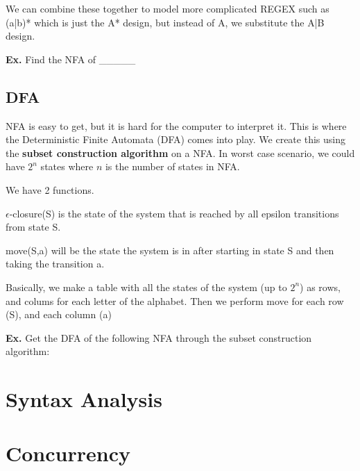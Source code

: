 \documentclass[12pt,letterpaper]{article} \usepackage{amsmath} \usepackage{graphicx} \usepackage[margin=1in]{geometry} \usepackage{longtable}  \usepackage{amssymb}
\begin{document}
	We can combine these together to model more complicated REGEX such as (a|b)* which is just the A* design, but instead of A, we substitute the A|B design.
	
	\begin{mdframed}
		\textbf{Ex. } Find the NFA of \_\_\_\_\_
	\end{mdframed}
	
	\subsection{DFA}
	NFA is easy to get, but it is hard for the computer to interpret it. This is where the Deterministic Finite Automata (DFA) comes into play. We create this using the \textbf{subset construction algorithm} on a NFA. In worst case scenario, we could have $2^n$ states where $n$ is the number of states in NFA.
	
	We have 2 functions.
	
	$\epsilon$-closure(S) is the state of the system that is reached by all epsilon transitions from state S. 
	
	move(S,a) will be the state the system is in after starting in state S and then taking the transition a.
	
	Basically, we make a table with all the states of the system (up to $2^n$) as rows, and colums for each letter of the alphabet. Then we perform move for each row (S), and each column (a)
	
	\begin{mdframed}
		\textbf{Ex. } Get the DFA of the following NFA through the subset construction algorithm:
	\end{mdframed}
	
	\section{Syntax Analysis}
	
	\section{Concurrency}

	
\end{document}
